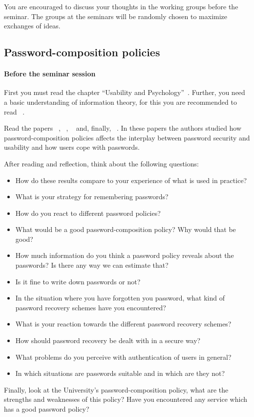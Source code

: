 You are encouraged to discuss your thoughts in the working groups before the 
seminar.
The groups at the seminars will be randomly chosen to maximize exchanges of 
ideas.

\subsection{Password-composition policies}%
\label{password-policies}

\paragraph{Before the seminar session}

First you must read the chapter \enquote{Usability and 
  Psychology}~\cite[Ch.~2]{Anderson2008sea}.
Further, you need a basic understanding of information theory, for this you are 
recommended to read ~\cite{Ueltschi2013se}.

Read the papers
~\cite{OfPasswordsAndPeople}, 
~\cite{GuessAgainAndAgain},
~\cite{CanLongPasswordsBeSecureAndUsable} 
and, finally,
~\cite{PasswordLifeCycle}.
In these papers the authors studied how password-composition policies affects 
the interplay between password security and usability and how users cope with 
passwords.

After reading and reflection, think about the following questions:
\begin{itemize}
  \item How do these results compare to your experience of what is used in 
    practice?
  \item What is your strategy for remembering passwords?
  \item How do you react to different password policies?
  \item What would be a good password-composition policy?
    Why would that be good?
  \item How much information do you think a password policy reveals about the 
    passwords?
    Is there any way we can estimate that?
  \item Is it fine to write down passwords or not?
  \item In the situation where you have forgotten you password,
  	what kind of password recovery schemes have you encountered?
  \item What is your reaction towards the different password recovery schemes?  
  \item How should password recovery be dealt with in a secure way?
  \item What problems do you perceive with authentication of users in general?
  \item In which situations are passwords suitable and in which are they not?
\end{itemize}
Finally, look at the University's password-composition policy, what are the 
strengths and weaknesses of this policy?
Have you encountered any service which has a good password policy?

